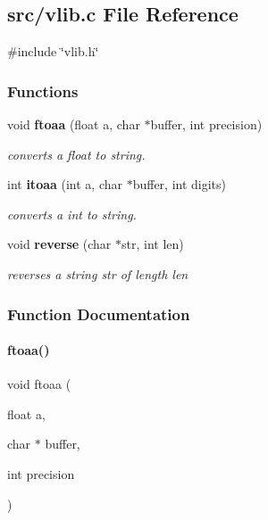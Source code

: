 \subsection{src/vlib.c File Reference}
\label{vlib_8c}
{\ttfamily \#include \char`\"{}vlib.\+h\char`\"{}}\newline
\subsubsection*{Functions}
\begin{DoxyCompactItemize}
\item 
void \textbf{ ftoaa} (float a, char $\ast$buffer, int precision)
\begin{DoxyCompactList}\small\item\em converts a float to string. \end{DoxyCompactList}\item 
int \textbf{ itoaa} (int a, char $\ast$buffer, int digits)
\begin{DoxyCompactList}\small\item\em converts a int to string. \end{DoxyCompactList}\item 
void \textbf{ reverse} (char $\ast$str, int len)
\begin{DoxyCompactList}\small\item\em reverses a string \textquotesingle{}str\textquotesingle{} of length \textquotesingle{}len\textquotesingle{} \end{DoxyCompactList}\end{DoxyCompactItemize}


\subsubsection{Function Documentation}
\mbox{\label{vlib_8c_a4d26b0ac2f26341d827e0a13a0bd49b6}} 
\paragraph{ftoaa()}
{\footnotesize\ttfamily void ftoaa (\begin{DoxyParamCaption}\item[{float}]{a,  }\item[{char $\ast$}]{buffer,  }\item[{int}]{precision }\end{DoxyParamCaption})}



